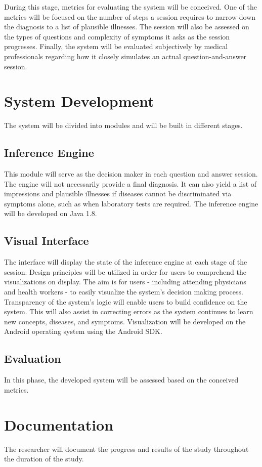 During this stage, metrics for evaluating the system will be conceived.
One of the metrics will be focused on the number of steps a session requires to narrow down the diagnosis to a list of plausible illnesses.
The session will also be assessed on the types of questions and complexity of symptoms it asks as the session progresses.
Finally, the system will be evaluated subjectively by medical professionals regarding how it closely simulates an actual question-and-answer session.

\section{System Development}
The system will be divided into modules and will be built in different stages. 

\subsection{Inference Engine}
This module will serve as the decision maker in each question and answer session.
The engine will not necessarily provide a final diagnosis.
It can also yield a list of impressions and plausible illnesses if diseases cannot be discriminated via symptoms alone, such as when laboratory tests are required.
The inference engine will be developed on Java 1.8.

\subsection{Visual Interface}
The interface will display the state of the inference engine at each stage of the session.
Design principles will be utilized in order for users to comprehend the visualizations on display.
The aim is for users - including attending physicians and health workers - to easily visualize the system's decision making process.
Transparency of the system's logic will enable users to build confidence on the system.
This will also assist in correcting errors as the system continues to learn new concepts, diseases, and symptoms.
Visualization will be developed on the Android operating system using the Android SDK.

\subsection{Evaluation}
In this phase, the developed system will be assessed based on the conceived metrics.
 
\section{Documentation}
The researcher will document the progress and results of the study throughout the duration of the study. 


